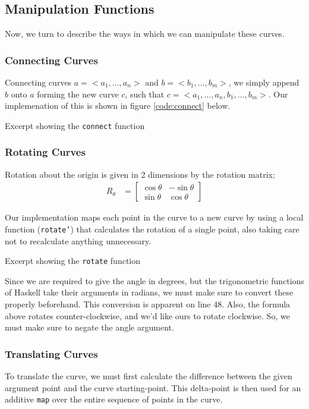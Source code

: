 


\newpage
\subsection{Manipulation Functions}
Now, we turn to describe the ways in which we can manipulate these curves.

\subsubsection{Connecting Curves}
Connecting curves $a = <a_1,\dots,a_n>$ and $b = <b_1,\dots,b_m>$, we simply
append $b$ onto $a$ forming the new curve $c$, such that $c =
<a_1,\dots,a_n,b_1,\dots,b_m>$. Our implemenation of this is shown in figure
\ref{code:connect} below.

{Excerpt showing the {\tt connect} function}

\subsubsection{Rotating Curves}
Rotation about the origin is given in 2 dimensions by the rotation matrix;
\begin{align}
    R_\theta &=
    \begin{bmatrix}
        \cos \theta & -\sin \theta \\
        \sin \theta & \cos \theta
    \end{bmatrix}
\end{align}

Our implementation maps each point in the curve to a new curve by using a
local function ({\tt rotate'}) that calculates the rotation of a single point,
also taking care not to recalculate anything unnecessary.

{Excerpt showing the {\tt rotate} function}

Since we are required to give the angle in degrees, but the trigonometric
functions of Haskell take their arguments in radians, we must make sure to
convert these properly beforehand. This conversion is apparent on line 48.
Also, the formula above rotates counter-clockwise, and we'd like ours to
rotate clockwise. So, we must make sure to negate the angle argument.

\subsubsection{Translating Curves}
To translate the curve, we must first calculate the difference between the
given argument point and the curve starting-point. This delta-point is then
used for an additive {\tt map} over the entire sequence of points in the
curve.


